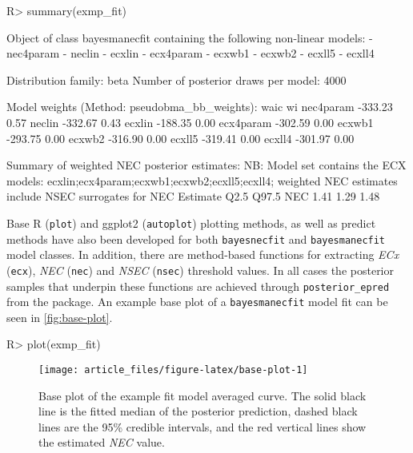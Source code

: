 \documentclass[
]{jss}
\begin{document}
\begin{CodeChunk}
\begin{CodeInput}
R> summary(exmp_fit)
\end{CodeInput}
\begin{CodeOutput}
Object of class bayesmanecfit containing the following non-linear models:
  -  nec4param
  -  neclin
  -  ecxlin
  -  ecx4param
  -  ecxwb1
  -  ecxwb2
  -  ecxll5
  -  ecxll4

Distribution family: beta
Number of posterior draws per model:  4000

Model weights (Method: pseudobma_bb_weights):
             waic   wi
nec4param -333.23 0.57
neclin    -332.67 0.43
ecxlin    -188.35 0.00
ecx4param -302.59 0.00
ecxwb1    -293.75 0.00
ecxwb2    -316.90 0.00
ecxll5    -319.41 0.00
ecxll4    -301.97 0.00


Summary of weighted NEC posterior estimates:
NB: Model set contains the ECX models: ecxlin;ecx4param;ecxwb1;ecxwb2;ecxll5;ecxll4; weighted NEC estimates include NSEC surrogates for NEC
    Estimate Q2.5 Q97.5
NEC     1.41 1.29  1.48
\end{CodeOutput}
\end{CodeChunk}

Base R (\texttt{plot}) and ggplot2 (\texttt{autoplot}) plotting methods,
as well as predict methods have also been developed for both
\texttt{bayesnecfit} and \texttt{bayesmanecfit} model classes. In
addition, there are method-based functions for extracting \emph{ECx}
(\texttt{ecx}), \emph{NEC} (\texttt{nec}) and \emph{NSEC}
(\texttt{nsec}) threshold values. In all cases the posterior samples
that underpin these functions are achieved through
\texttt{posterior\_epred} from the  package. An example base
plot of a \texttt{bayesmanecfit} model fit can be seen in
\autoref{fig:base-plot}.

\begin{CodeChunk}
\begin{CodeInput}
R> plot(exmp_fit)
\end{CodeInput}
\begin{figure}

{\centering \texttt{[image: article\_files/figure-latex/base-plot-1]} 

}

\caption[Base plot of the example fit model averaged curve]{Base plot of the example fit model averaged curve. The solid black line is the fitted median of the posterior prediction, dashed black lines are the 95\% credible intervals, and the red vertical lines show the estimated \textit{NEC} value.}\label{fig:base-plot}
\end{figure}
\end{CodeChunk}
\end{document}
